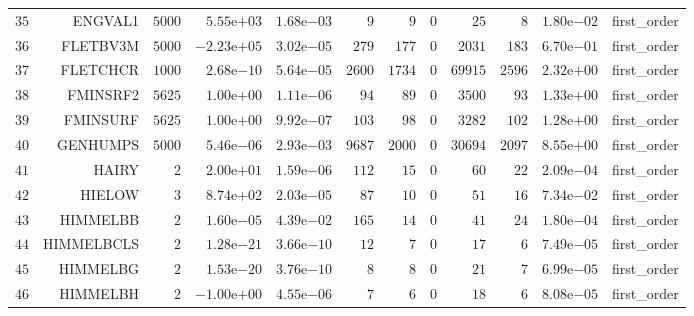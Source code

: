 \begin{longtable}{rrrrrrrrrrrr}
  \(    35\) & ENGVAL1 & \(  5000\) & \( 5.55\)e\(+03\) & \( 1.68\)e\(-03\) & \(     9\) & \(     9\) & \(     0\) & \(    25\) & \(     8\) & \( 1.80\)e\(-02\) & first\_order \\
  \(    36\) & FLETBV3M & \(  5000\) & \(-2.23\)e\(+05\) & \( 3.02\)e\(-05\) & \(   279\) & \(   177\) & \(     0\) & \(  2031\) & \(   183\) & \( 6.70\)e\(-01\) & first\_order \\
  \(    37\) & FLETCHCR & \(  1000\) & \( 2.68\)e\(-10\) & \( 5.64\)e\(-05\) & \(  2600\) & \(  1734\) & \(     0\) & \( 69915\) & \(  2596\) & \( 2.32\)e\(+00\) & first\_order \\
  \(    38\) & FMINSRF2 & \(  5625\) & \( 1.00\)e\(+00\) & \( 1.11\)e\(-06\) & \(    94\) & \(    89\) & \(     0\) & \(  3500\) & \(    93\) & \( 1.33\)e\(+00\) & first\_order \\
  \(    39\) & FMINSURF & \(  5625\) & \( 1.00\)e\(+00\) & \( 9.92\)e\(-07\) & \(   103\) & \(    98\) & \(     0\) & \(  3282\) & \(   102\) & \( 1.28\)e\(+00\) & first\_order \\
  \(    40\) & GENHUMPS & \(  5000\) & \( 5.46\)e\(-06\) & \( 2.93\)e\(-03\) & \(  9687\) & \(  2000\) & \(     0\) & \( 30694\) & \(  2097\) & \( 8.55\)e\(+00\) & first\_order \\
  \(    41\) & HAIRY & \(     2\) & \( 2.00\)e\(+01\) & \( 1.59\)e\(-06\) & \(   112\) & \(    15\) & \(     0\) & \(    60\) & \(    22\) & \( 2.09\)e\(-04\) & first\_order \\
  \(    42\) & HIELOW & \(     3\) & \( 8.74\)e\(+02\) & \( 2.03\)e\(-05\) & \(    87\) & \(    10\) & \(     0\) & \(    51\) & \(    16\) & \( 7.34\)e\(-02\) & first\_order \\
  \(    43\) & HIMMELBB & \(     2\) & \( 1.60\)e\(-05\) & \( 4.39\)e\(-02\) & \(   165\) & \(    14\) & \(     0\) & \(    41\) & \(    24\) & \( 1.80\)e\(-04\) & first\_order \\
  \(    44\) & HIMMELBCLS & \(     2\) & \( 1.28\)e\(-21\) & \( 3.66\)e\(-10\) & \(    12\) & \(     7\) & \(     0\) & \(    17\) & \(     6\) & \( 7.49\)e\(-05\) & first\_order \\
  \(    45\) & HIMMELBG & \(     2\) & \( 1.53\)e\(-20\) & \( 3.76\)e\(-10\) & \(     8\) & \(     8\) & \(     0\) & \(    21\) & \(     7\) & \( 6.99\)e\(-05\) & first\_order \\
  \(    46\) & HIMMELBH & \(     2\) & \(-1.00\)e\(+00\) & \( 4.55\)e\(-06\) & \(     7\) & \(     6\) & \(     0\) & \(    18\) & \(     6\) & \( 8.08\)e\(-05\) & first\_order \\

\end{longtable}
